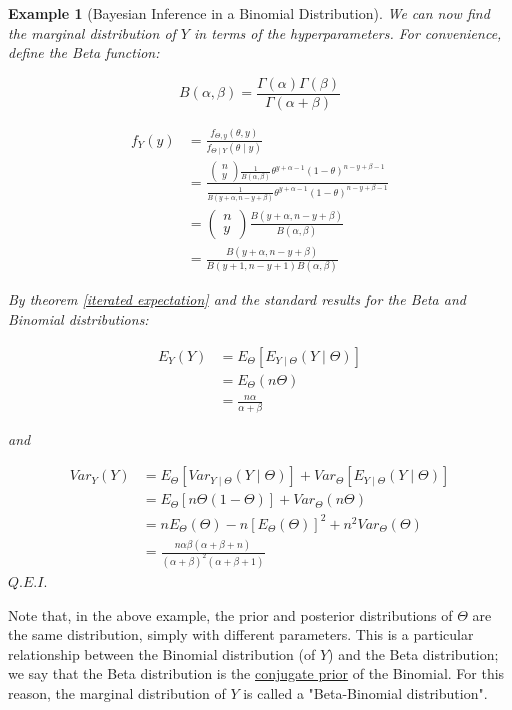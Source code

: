 \documentclass[12pt,a4paper]{article}
\newtheorem{ex}[thm]{Example}
\begin{document}
\begin{ex}[Bayesian Inference in a Binomial Distribution]
We can now find the marginal distribution of $Y$ in terms of the hyperparameters. For convenience, define the Beta function:

$$B(\alpha,\beta) = \frac{\Gamma(\alpha)\Gamma(\beta)}{\Gamma(\alpha + \beta)}$$

\begin{align*}
f_Y(y) &= \frac{f_{\Theta,y}(\theta,y)}{f_{\Theta\mid Y}(\theta \mid y)}\\
&= \frac{\left(\!\!\begin{array}{c} n\\y \end{array}\!\!\right) \frac{1}{B(\alpha,\beta)} \theta^{y+\alpha-1} (1-\theta)^{n-y+\beta-1}}{\frac{1}{B(y+\alpha,n-y+\beta)} \theta^{y+\alpha-1} (1-\theta)^{n-y+\beta -1}}\\
&= \left(\!\!\begin{array}{c} n\\y \end{array}\!\!\right) \frac{B(y+\alpha,n-y+\beta)}{B(\alpha,\beta)}\\
&= \frac{B(y+\alpha,n-y+\beta)}{B(y+1,n-y+1)B(\alpha,\beta)}
\end{align*}

By theorem \ref{iterated expectation} and the standard results for the Beta and Binomial distributions:

\begin{align*}
E_Y(Y) &= E_\Theta[E_{Y\mid \Theta}(Y\mid\Theta)]\\
&= E_\Theta(n\Theta)\\
&= \frac{n\alpha}{\alpha+\beta}
\end{align*}
\begin{center} and \end{center}
\begin{align*}
Var_Y(Y) &= E_\Theta[Var_{Y\mid\Theta}(Y\mid\Theta)] + Var_\Theta[E_{Y\mid\Theta}(Y\mid\Theta)]\\
&= E_\Theta[n\Theta(1-\Theta)] + Var_\Theta(n\Theta)\\
&= nE_\Theta(\Theta) - n[E_\Theta(\Theta)]^2 + n^2 Var_\Theta(\Theta)\\
&=  \frac{n\alpha\beta(\alpha+\beta+n)}{(\alpha+\beta)^2(\alpha+\beta+1)}
\end{align*}\hfill$Q.E.I.$

\end{ex}

Note that, in the above example, the prior and posterior distributions of $\Theta$ are the same distribution, simply with different parameters. This is a particular relationship between the Binomial distribution (of $Y$) and the Beta distribution; we say that the Beta distribution is the \underline{conjugate prior} of the Binomial. For this reason, the marginal distribution of $Y$ is called a "Beta-Binomial distribution".
\end{document}
